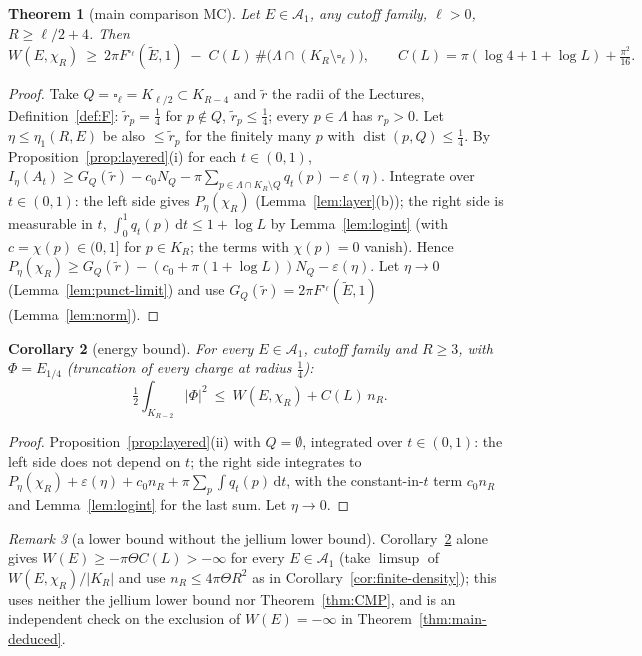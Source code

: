\documentclass[11pt]{article}
\newtheorem{theorem}{Theorem}[section]
\newtheorem{corollary}[theorem]{Corollary}
\theoremstyle{definition}
\theoremstyle{remark}
\newtheorem{remark}[theorem]{Remark}
\newcommand{\dd}{\,\mathrm d}
\newcommand{\Lam}{\Lambda}
\newcommand{\tE}{\widetilde E}
\DeclareMathOperator{\dist}{dist}
\begin{document}
\begin{theorem}[main comparison MC]\label{thm:MC}
Let $E\in\mathcal A_1$, any cutoff family, $\ell>0$, $R\ge\ell/2+4$. Then
\[
W(E,\chi_R)\ \ge\ 2\pi F^{\square_\ell}(\tE,1)\;-\;C(L)\,\#\bigl(\Lam\cap(K_R\setminus\square_\ell)\bigr),\qquad C(L)=\pi(\log4+1+\log L)+\tfrac{\pi^2}{16}.
\]
\end{theorem}
\begin{proof}
Take $Q=\square_\ell=K_{\ell/2}\subset K_{R-4}$ and $\tilde r$ the radii of the Lectures, Definition~\ref{def:F}: $\tilde r_p=\frac14$ for $p\notin Q$, $\tilde r_p\le\frac14$; every $p\in\Lam$ has $r_p>0$.  Let $\eta\le\eta_1(R,E)$ be also $\le\tilde r_p$ for the finitely many $p$ with $\dist(p,Q)\le\frac14$.  By Proposition~\ref{prop:layered}(i) for each $t\in(0,1)$,
$I_\eta(A_t)\ge G_Q(\tilde r)-c_0N_Q-\pi\sum_{p\in\Lam\cap K_R\setminus Q}q_t(p)-\varepsilon(\eta)$.  Integrate over $t\in(0,1)$: the left side gives $P_\eta(\chi_R)$ (Lemma~\ref{lem:layer}(b)); the right side is measurable in $t$, $\int_0^1q_t(p)\dd t\le1+\log L$ by Lemma~\ref{lem:logint} (with $c=\chi(p)\in(0,1]$ for $p\in K_R$; the terms with $\chi(p)=0$ vanish).  Hence
$P_\eta(\chi_R)\ge G_Q(\tilde r)-(c_0+\pi(1+\log L))N_Q-\varepsilon(\eta)$.  Let $\eta\to0$ (Lemma~\ref{lem:punct-limit}) and use $G_Q(\tilde r)=2\pi F^{\square_\ell}(\tE,1)$ (Lemma~\ref{lem:norm}).
\end{proof}

\begin{corollary}[energy bound]\label{cor:EB}
For every $E\in\mathcal A_1$, cutoff family and $R\ge3$, with $\Phi=E_{1/4}$ (truncation of every charge at radius $\frac14$):
\[
\tfrac12\int_{K_{R-2}}|\Phi|^2\ \le\ W(E,\chi_R)+C(L)\,n_R .
\]
\end{corollary}
\begin{proof}
Proposition~\ref{prop:layered}(ii) with $Q=\emptyset$, integrated over $t\in(0,1)$: the left side does not depend on $t$; the right side integrates to $P_\eta(\chi_R)+\varepsilon(\eta)+c_0n_R+\pi\sum_p\int q_t(p)\dd t$, with the constant-in-$t$ term $c_0n_R$ and Lemma~\ref{lem:logint} for the last sum.  Let $\eta\to0$.
\end{proof}

\begin{remark}[a lower bound without the jellium lower bound]\label{rem:O1}
Corollary~\ref{cor:EB} alone gives $W(E)\ge-\pi\Theta C(L)>-\infty$ for every $E\in\mathcal A_1$ (take $\limsup$ of $W(E,\chi_R)/|K_R|$ and use $n_R\le4\pi\Theta R^2$ as in Corollary~\ref{cor:finite-density}); this uses neither the jellium lower bound nor Theorem~\ref{thm:CMP}, and is an independent check on the exclusion of $W(E)=-\infty$ in Theorem~\ref{thm:main-deduced}.
\end{remark}
\end{document}
